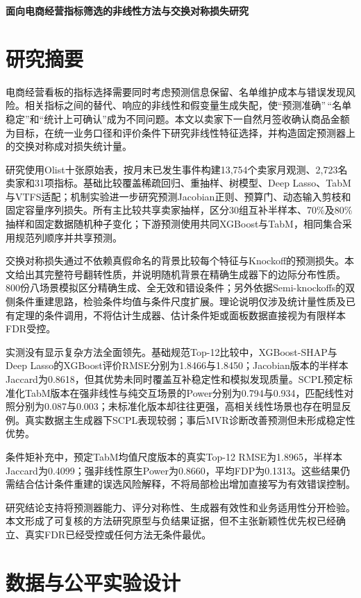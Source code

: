 \documentclass[UTF8,11pt,a4paper]{ctexart}
\begin{document}
\begin{center}\large\bfseries 面向电商经营指标筛选的非线性方法与交换对称损失研究\end{center}\section{研究摘要}

电商经营看板的指标选择需要同时考虑预测信息保留、名单维护成本与错误发现风险。相关指标之间的替代、响应的非线性和假变量生成失配，使``预测准确''\,``名单稳定''和``统计上可确认''成为不同问题。本文以卖家下一自然月签收确认商品金额为目标，在统一业务口径和评价条件下研究非线性特征选择，并构造固定预测器上的交换对称成对损失统计量。

研究使用Olist十张原始表，按月末已发生事件构建13,754个卖家月观测、2,723名卖家和31项指标。基础比较覆盖稀疏回归、重抽样、树模型、Deep Lasso、TabM与VTFS适配；机制实验进一步研究预测Jacobian正则、预算门、动态输入剪枝和固定容量序列损失。所有主比较共享卖家抽样，区分30组互补半样本、70\%及80\%抽样和固定数据随机种子变化；下游预测使用共同XGBoost与TabM，相同集合采用规范列顺序并共享预测。

交换对称损失通过不依赖真假命名的背景比较每个特征与Knockoff的预测损失。本文给出其完整符号翻转性质，并说明随机背景在精确生成器下的边际分布性质。800份八场景模拟区分精确生成、全无效和错设条件；另外依据Semi-knockoffs的双侧条件重建思路，检验条件均值与条件尺度扩展。理论说明仅涉及统计量性质及已有定理的条件调用，不将估计生成器、估计条件矩或面板数据直接视为有限样本FDR受控。

实测没有显示复杂方法全面领先。基础规范Top-12比较中，XGBoost-SHAP与Deep Lasso的XGBoost评价RMSE分别为1.8466与1.8450；Jacobian版本的半样本Jaccard为0.8618，但其优势未同时覆盖互补稳定性和模拟发现质量。SCPL预定标准化TabM版本在强非线性与纯交互场景的Power分别为0.794与0.934，匹配线性对照分别为0.087与0.003；未标准化版本却往往更强，高相关线性场景也存在明显反例。真实数据主生成器下SCPL表现较弱；事后MVR诊断改善预测但未形成稳定性优势。

条件矩补充中，预定TabM均值尺度版本的真实Top-12 RMSE为1.8965，半样本Jaccard为0.4099；强非线性原生Power为0.8660，平均FDP为0.1313。这些结果仍需结合估计条件重建的误选风险解释，不将局部检出增加直接写为有效错误控制。

研究结论支持将预测器能力、评分对称性、生成器有效性和业务适用性分开检验。本文形成了可复核的方法研究原型与负结果证据，但不主张新颖性优先权已经确立、真实FDR已经受控或任何方法无条件最优。

\section{数据与公平实验设计}
\end{document}
